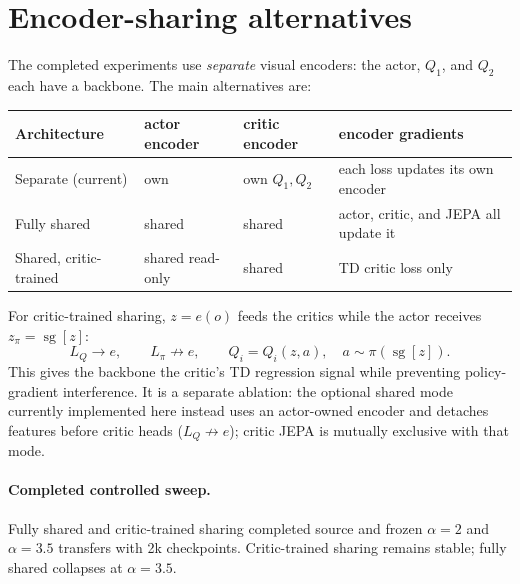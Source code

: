 \documentclass[10pt]{article}
\begin{document}
\section{Encoder-sharing alternatives}
The completed experiments use \emph{separate} visual encoders: the actor,
$Q_1$, and $Q_2$ each have a backbone. The main alternatives are:
\begin{center}
\begin{tabular}{llll}
\toprule
Architecture & actor encoder & critic encoder & encoder gradients\\
\midrule
Separate (current) & own & own $Q_1,Q_2$ & each loss updates its own encoder\\
Fully shared & shared & shared & actor, critic, and JEPA all update it\\
Shared, critic-trained & shared read-only & shared & TD critic loss only\\
\bottomrule
\end{tabular}
\end{center}
For critic-trained sharing, $z=e(o)$ feeds the critics while the actor receives
$z_\pi=\operatorname{sg}[z]$:
\[
 L_Q\rightarrow e,\qquad L_\pi\not\rightarrow e,\qquad
 Q_i=Q_i(z,a),\quad a\sim\pi(\operatorname{sg}[z]).
\]
This gives the backbone the critic's TD regression signal while preventing
policy-gradient interference. It is a separate ablation: the optional shared
mode currently implemented here instead uses an actor-owned encoder and detaches
features before critic heads ($L_Q\not\rightarrow e$); critic JEPA is mutually
exclusive with that mode.

\paragraph{Completed controlled sweep.}
Fully shared and critic-trained sharing completed source and frozen $\alpha=2$
and $\alpha=3.5$ transfers with 2k checkpoints. Critic-trained sharing remains
stable; fully shared collapses at $\alpha=3.5$.
\end{document}
